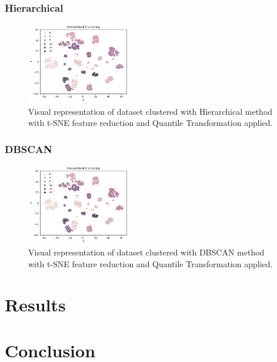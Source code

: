 \documentclass{article}
\begin{document}
\begin{multicols}{2}
\subsubsection{Hierarchical}

\begin{figure}[H]
    \centering
    \includegraphics[width=0.4\textwidth]{images/hierarchical.png}
    \caption{Visual representation of dataset clustered with Hierarchical method with t-SNE feature reduction and Quantile Transformation applied.}
\end{figure}

\subsubsection{DBSCAN}

\begin{figure}[H]
    \centering
    \includegraphics[width=0.4\textwidth]{images/hierarchical.png}
    \caption{Visual representation of dataset clustered with DBSCAN method with t-SNE feature reduction and Quantile Transformation applied.}
\end{figure}
\section{Results}
\section{Conclusion}
\end{multicols}

\pagebreak

\end{document}
